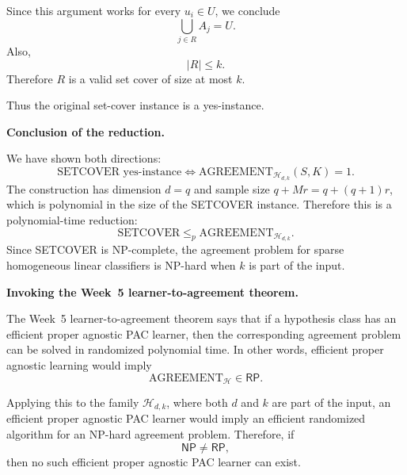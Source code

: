 \documentclass[11pt]{article}
\begin{document}
\begin{enumerate}
\begin{solutionbox}
        Since this argument works for every $u_i\in U$, we conclude
        \[
        \bigcup_{j\in R}A_j=U.
        \]
        Also,
        \[
        |R|\le k.
        \]
        Therefore $R$ is a valid set cover of size at most $k$.

        Thus the original set-cover instance is a yes-instance.

        \medskip

        \textbf{Conclusion of the reduction.}

        We have shown both directions:
        \[
        \text{SETCOVER yes-instance}
        \iff
        \mathrm{AGREEMENT}_{\mathcal{H}_{d,k}}(S,K)=1.
        \]
        The construction has dimension $d=q$ and sample size $q+Mr=q+(q+1)r$, which is
        polynomial in the size of the SETCOVER instance. Therefore this is a polynomial-time
        reduction:
        \[
        \mathrm{SETCOVER}
        \le_p
        \mathrm{AGREEMENT}_{\mathcal{H}_{d,k}}.
        \]
        Since SETCOVER is NP-complete, the agreement problem for sparse homogeneous linear
        classifiers is NP-hard when $k$ is part of the input.

        \medskip

        \textbf{Invoking the Week~5 learner-to-agreement theorem.}

        The Week~5 learner-to-agreement theorem says that if a hypothesis class has an efficient
        proper agnostic PAC learner, then the corresponding agreement problem can be solved in
        randomized polynomial time. In other words, efficient proper agnostic learning would imply
        \[
        \mathrm{AGREEMENT}_{\mathcal{H}}\in\mathsf{RP}.
        \]

        Applying this to the family $\mathcal{H}_{d,k}$, where both $d$ and $k$ are part of the
        input, an efficient proper agnostic PAC learner would imply an efficient randomized
        algorithm for an NP-hard agreement problem. Therefore, if
        \[
        \mathsf{NP}\ne\mathsf{RP},
        \]
        then no such efficient proper agnostic PAC learner can exist.


\end{solutionbox}
\end{enumerate}
\end{document}
